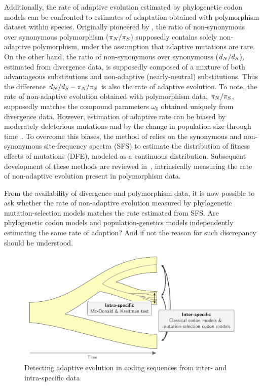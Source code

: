 Additionally, the rate of adaptive evolution estimated by phylogenetic codon models can be confronted to estimates of adaptation obtained with polymorphism dataset within species.
Originally pioneered by \citet{McDonald1991}, the ratio of non-synonymous over synonymous polymorphism ($\pi_N / \pi_S$) supposedly contains solely non-adaptive polymorphism, under the assumption that adaptive mutations are rare.
On the other hand, the ratio of non-synonymous over \glspl{synonymous} ($d_N / d_S$), estimated from divergence data, is supposedly composed of a mixture of both advantageous \glspl{substitution} and non-adaptive (\gls{nearly-neutral}) \glspl{substitution}.
Thus the difference $d_N / d_S - \pi_N / \pi_S$ is also the rate of adaptive evolution.
To note, the rate of non-adaptive evolution obtained with polymorphism data, $\pi_N / \pi_S$, supposedly matches the compound parameters $\omega_0$ obtained uniquely from divergence data.
However, estimation of adaptive rate can be biased by moderately deleterious mutations and by the change in population size through time~\citep{eyre-walker_changing_2002}.
To overcome this biases, the method of \citet{eyre-walker_estimating_2009, Galtier2016} relies on the synonymous and non-synonymous site-frequency spectra (\acrshort{SFS}) to estimate the distribution of fitness effects of mutations (\acrshort{DFE}), modeled as a continuous distribution.
Subsequent development of these methods are reviewed in~\citep{Moutinho2019a}, intrinsically measuring the rate of non-adaptive evolution present in polymorphism data.

From the availability of divergence and polymorphism data, it is now possible to ask whether the rate of non-adaptive evolution measured by phylogenetic mutation-selection models matches the rate estimated from \acrshort{SFS}.
Are phylogenetic \gls{codon} models and population-genetics models independently estimating the same rate of adaption?
And if not the reason for such discrepancy should be understood.

\begin{figure}[H]
    \centering
    \includegraphics[width=\textwidth] {figures/inter-intra}
    \caption{Detecting adaptive evolution in coding sequences from inter- and intra-specific data}
    \label{fig:detecting-adaptation-inter-intra}
\end{figure}


